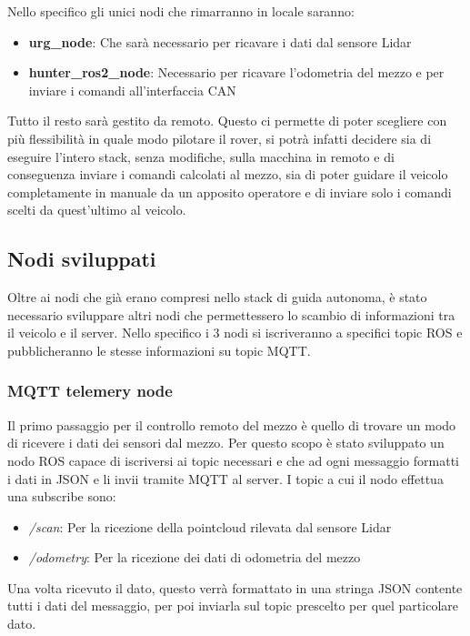 \noindent Nello specifico gli unici nodi che rimarranno in locale saranno:

\begin{itemize}
  \item \textbf{urg\_node}: Che sarà necessario per ricavare i dati dal sensore Lidar
  \item \textbf{hunter\_ros2\_node}: Necessario per ricavare l'odometria del mezzo e per inviare i comandi all'interfaccia CAN
\end{itemize}

\noindent Tutto il resto sarà gestito da remoto. Questo ci permette di poter scegliere con più flessibilità in quale modo pilotare il rover, si potrà infatti decidere sia di eseguire l'intero stack, senza modifiche, sulla macchina in remoto e di conseguenza inviare i comandi calcolati al mezzo, sia di poter guidare il veicolo completamente in manuale da un apposito operatore e di inviare solo i comandi scelti da quest'ultimo al veicolo.

\subsection{Nodi sviluppati}
Oltre ai nodi che già erano compresi nello stack di guida autonoma, è stato necessario sviluppare altri nodi che permettessero lo scambio di informazioni tra il veicolo e il server. Nello specifico i 3 nodi si iscriveranno a specifici topic ROS e pubblicheranno le stesse informazioni su topic MQTT.

\subsubsection{MQTT telemery node}
Il primo passaggio per il controllo remoto del mezzo è quello di trovare un modo di ricevere i dati dei sensori dal mezzo. Per questo scopo è stato sviluppato un nodo ROS capace di iscriversi ai topic necessari e che ad ogni messaggio formatti i dati in JSON e li invii tramite MQTT al server.
I topic a cui il nodo effettua una subscribe sono:
\begin{itemize}
  \item \textit{/scan}: Per la ricezione della pointcloud rilevata dal sensore Lidar
  \item \textit{/odometry}: Per la ricezione dei dati di odometria del mezzo
\end{itemize}

\noindent Una volta ricevuto il dato, questo verrà formattato in una stringa JSON contente tutti i dati del messaggio, per poi inviarla sul topic prescelto per quel particolare dato.

